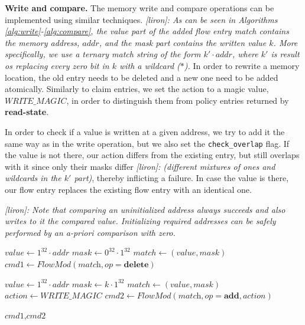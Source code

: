 \documentclass[conference]{sigcomm-alternate}
\newcommand{\concat}[0]{\cdot}
\newcommand{\compare}{compare\xspace}
\newcommand{\memwrite}{write\xspace}
\newcommand{\addr}{\textit{addr}\xspace}
\newcommand{\add}{\textbf{add}\xspace}
\newcommand{\dele}{\textbf{delete}\xspace}
\newcommand{\checko}{\texttt{check\_overlap}\xspace}
\newcommand{\liron}[1]{\textit{\textcolor{mypurple}{[liron]: #1}}} %
\newcommand{\ones}[1]{1^{#1}}
\newcommand{\zeros}[1]{0^{#1}}
\newcommand{\memmagic}{\textit{WRITE\_MAGIC}}
\begin{document}
\vspace{1mm}
\noindent\textbf{Write and compare.}
The memory \memwrite and \compare
 operations can be implemented using similar techniques.
 \liron{
 As can be seen in Algorithms \ref{alg:write}-\ref{alg:compare},
  the value part of the added flow entry match contains the memory address, $addr$, and the mask part contains
  the written value $k$. More specifically, we use a ternary match string of the form $k'\concat \addr$, where $k'$ is result os replacing every zero bit in $k$ with a wildcard ($*$).}
  In order to rewrite a memory location, the old entry needs to be deleted and a new one need to be added atomically.
Similarly to claim entries, we set the action to a magic value, $\memmagic$, in order to distinguish them from policy entries returned by \textbf{read-state}.


In order to check if a value is written at a given address,
we try to add it the same way as in the \memwrite operation,
but we also set the \texttt{\checko} flag. If the value is not there,
our action differs from the existing entry, but still overlaps with it since only their masks differ \liron{(different mixtures of ones and wildcards in the $k'$ part)},
thereby inflicting a failure.
In case the value is there, our flow entry replaces the existing flow entry
with an identical one.

\liron{Note that comparing an uninitialized address always succeeds and also writes to it the compared value. Initializing required addresses can be safely performed by an a-priori comparison with zero.}


\begin{algorithm}[t]
    \caption{$\textit{write}(\addr,k)$}
    \label{alg:write}
    \begin{algorithmic}[1]
    		\State $value \gets \ones{32}\concat\addr$
    		\State $mask \gets  \zeros{32}\concat\ones{32}$
    		\State $match \gets (value,mask)$
    		\State $\textit{cmd1}\gets \textit{FlowMod}(\textit{match}, op = \dele) $
    		
  		   \State $value \gets \ones{32}\concat\addr$
  		   \State $mask \gets  k\concat\ones{32}$
  		   \State $match \gets (value,mask)$
 		   \State $action \gets \memmagic$
		   \State $\textit{cmd2}\gets \textit{FlowMod}(\textit{match}, op = \add,  \textit{action}) $
		    		
			\Return $\textit{cmd1}$,$\textit{cmd2}$
    \end{algorithmic}
\end{algorithm}
\end{document}
